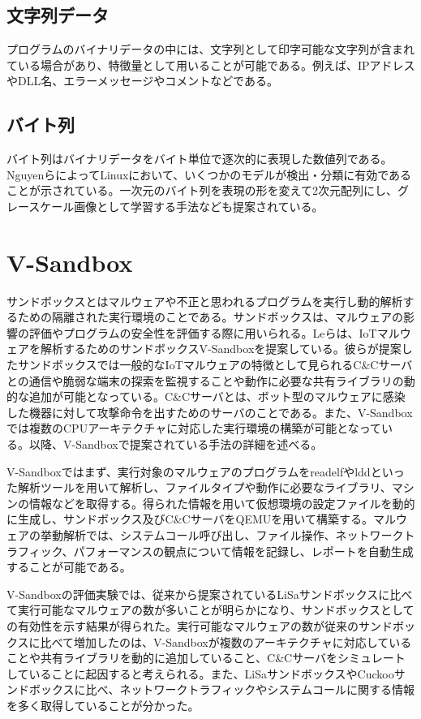 \documentclass[12pt,a4paper,titlepage,report]{jsbook}
\begin{document}
\subsection{文字列データ}
プログラムのバイナリデータの中には、文字列として印字可能な文字列が含まれている場合があり、特徴量として用いることが可能である。例えば、IPアドレスやDLL名、エラーメッセージやコメントなどである。

\subsection{バイト列}
バイト列はバイナリデータをバイト単位で逐次的に表現した数値列である。NguyenらによってLinuxにおいて、いくつかのモデルが検出・分類に有効であることが示されている\cite{bytelinux}。一次元のバイト列を表現の形を変えて2次元配列にし、グレースケール画像として学習する手法なども提案されている\cite{malwaresurvey}。

\section{V-Sandbox}
サンドボックスとはマルウェアや不正と思われるプログラムを実行し動的解析するための隔離された実行環境のことである。サンドボックスは、マルウェアの影響の評価やプログラムの安全性を評価する際に用いられる。Leらは、IoTマルウェアを解析するためのサンドボックスV-Sandboxを提案している\cite{vsandbox}。彼らが提案したサンドボックスでは一般的なIoTマルウェアの特徴として見られるC\&Cサーバとの通信や脆弱な端末の探索を監視することや動作に必要な共有ライブラリの動的な追加が可能となっている。C\&Cサーバとは、ボット型のマルウェアに感染した機器に対して攻撃命令を出すためのサーバのことである。また、V-Sandboxでは複数のCPUアーキテクチャに対応した実行環境の構築が可能となっている。以降、V-Sandboxで提案されている手法の詳細を述べる。

V-Sandboxではまず、実行対象のマルウェアのプログラムをreadelfやlddといった解析ツールを用いて解析し、ファイルタイプや動作に必要なライブラリ、マシンの情報などを取得する。得られた情報を用いて仮想環境の設定ファイルを動的に生成し、サンドボックス及びC\&CサーバをQEMUを用いて構築する。マルウェアの挙動解析では、システムコール呼び出し、ファイル操作、ネットワークトラフィック、パフォーマンスの観点について情報を記録し、レポートを自動生成することが可能である。

V-Sandboxの評価実験では、従来から提案されているLiSaサンドボックスに比べて実行可能なマルウェアの数が多いことが明らかになり、サンドボックスとしての有効性を示す結果が得られた。実行可能なマルウェアの数が従来のサンドボックスに比べて増加したのは、V-Sandboxが複数のアーキテクチャに対応していることや共有ライブラリを動的に追加していること、C\&Cサーバをシミュレートしていることに起因すると考えられる。また、LiSaサンドボックスやCuckooサンドボックスに比べ、ネットワークトラフィックやシステムコールに関する情報を多く取得していることが分かった。
\end{document}
